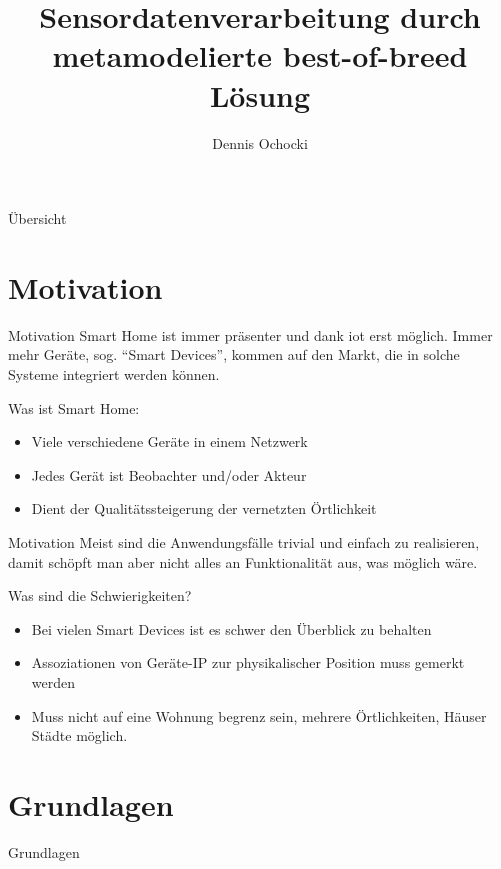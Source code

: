 \documentclass[12pt, pdf, xcolor={table, dvipsnames}, paperheight=8cm,paperwidth=12cm]{beamer}
\author{Dennis Ochocki}
\title[]{Sensordatenverarbeitung durch metamodelierte best-of-breed Lösung}
\begin{document}
	
\maketitle

\begin{frame}{Übersicht}
	\tableofcontents
\end{frame}

\section{Motivation}
\begin{frame}{Motivation}
	Smart Home ist immer präsenter und dank \gls{iot} erst möglich. Immer mehr Geräte, sog. \enquote{Smart Devices}, kommen auf den Markt, die in solche Systeme integriert werden können. 
	
	
	\begin{block}{Was ist Smart Home:}
		\begin{itemize}
			\item Viele verschiedene Geräte in einem Netzwerk
			\item Jedes Gerät ist Beobachter und/oder Akteur
			\item Dient der Qualitätssteigerung der vernetzten Örtlichkeit
		\end{itemize}
	\end{block}
\end{frame}

\begin{frame}{Motivation}
Meist sind die Anwendungsfälle trivial und einfach zu realisieren, damit schöpft man aber nicht alles an Funktionalität aus, was möglich wäre.
\begin{block}{Was sind die Schwierigkeiten?}
	\begin{itemize}
		\item Bei vielen Smart Devices ist es schwer den Überblick zu behalten
		\item Assoziationen von Geräte-IP zur physikalischer Position muss gemerkt werden
		\item Muss nicht auf eine Wohnung begrenz sein, mehrere Örtlichkeiten, Häuser Städte möglich.
	\end{itemize}
\end{block}
\end{frame}


\section{Grundlagen}
\begin{frame}{Grundlagen}
\end{frame}
\end{document}
